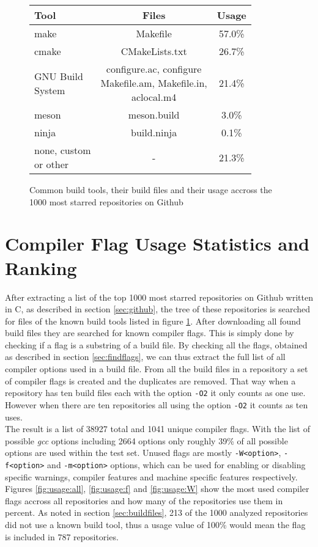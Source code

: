 \documentclass[9pt, a4paper, twocolumn]{article}
\begin{document}
\begin{figure}[H]
	\centering
	\begin{tabular}{l | c | c}
		Tool & Files & Usage \\
		\hline
		make & Makefile & 57.0\% \\
		cmake & CMakeLists.txt & 26.7\% \\
		\makecell[l]{GNU Build \\ System} & \makecell{configure.ac, configure \\ Makefile.am, Makefile.in, \\ aclocal.m4} & 21.4\% \\
		meson & meson.build & 3.0\% \\
		ninja & build.ninja & 0.1\% \\
		\makecell[l]{none, custom \\ or other} & - & 21.3\% \\
	\end{tabular}
	\caption{Common build tools, their build files and their usage accross the 1000 most starred repositories on Github}
	\label{fig:buildtools}
\end{figure}

\section{Compiler Flag Usage Statistics and Ranking} \label{sec:usage}
After extracting a list of the top 1000 most starred repositories on Github written in C, as described in section \ref{sec:github}, the tree of these repositories is searched for files of the known build tools listed in figure \ref{fig:buildtools}. After downloading all found build files they are searched for known compiler flags. This is simply done by checking if a flag is a substring of a build file. By checking all the flags, obtained as described in section \ref{sec:findflags}, we can thus extract the full list of all compiler options used in a build file. From all the build files in a repository a set of compiler flags is created and the duplicates are removed. That way when a repository has ten build files each with the option \verb'-O2' it only counts as one use. However when there are ten repositories all using the option \verb'-O2' it counts as ten uses. \\
The result is a list of 38927 total and 1041 unique compiler flags. With the list of possible \textit{gcc} options including 2664 options only roughly 39\% of all possible options are used within the test set. Unused flags are mostly \verb'-W<option>', \verb'-f<option>' and \verb'-m<option>' options, which can be used for enabling or disabling specific warnings, compiler features and machine specific features respectively. \\
Figures \ref{fig:usage:all}, \ref{fig:usage:f} and \ref{fig:usage:W} show the most used compiler flags accross all repositories and how many of the repositories use them in percent. As noted in section \ref{sec:buildfiles}, 213 of the 1000 analyzed repositories did not use a known build tool, thus a usage value of 100\% would mean the flag is included in 787 repositories.
\end{document}
